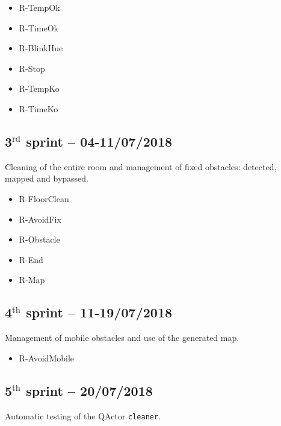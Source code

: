 \begin{itemize}
	\ttfamily
	\item R-TempOk
	\item R-TimeOk
	\item R-BlinkHue
	\item R-Stop
	\item R-TempKo
	\item R-TimeKo
\end{itemize}

\subsection{3$^{\textrm{rd}}$ sprint -- 04-11/07/2018}
Cleaning of the entire room and management of fixed obstacles: detected, mapped and bypassed.

\begin{itemize}
	\ttfamily
	\item R-FloorClean
	\item R-AvoidFix
	\item R-Obstacle
	\item R-End
	\item R-Map
\end{itemize}

\subsection{4$^{\textrm{th}}$ sprint -- 11-19/07/2018}
Management of mobile obstacles and use of the generated map.

\begin{itemize}
	\ttfamily
	\item R-AvoidMobile
\end{itemize}

\subsection{5$^{\textrm{th}}$ sprint -- 20/07/2018}
Automatic testing of the QActor \texttt{cleaner}.


